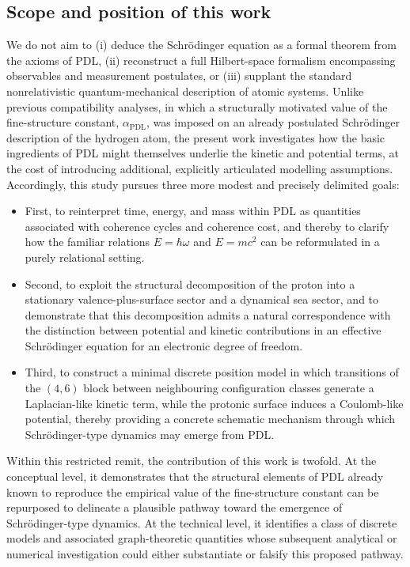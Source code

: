 \documentclass[11pt,a4paper]{article}
\begin{document}
\subsection{Scope and position of this work}

We do not aim to (i) deduce the Schr\"odinger equation as a formal theorem from the axioms of PDL, (ii) reconstruct a full Hilbert-space formalism encompassing observables and measurement postulates, or (iii) supplant the standard nonrelativistic quantum-mechanical description of atomic systems. Unlike previous compatibility analyses, in which a structurally motivated value of the fine-structure constant, $\alpha_{\mathrm{PDL}}$, was imposed on an already postulated Schr\"odinger description of the hydrogen atom, the present work investigates how the basic ingredients of PDL might themselves underlie the kinetic and potential terms, at the cost of introducing additional, explicitly articulated modelling assumptions. Accordingly, this study pursues three more modest and precisely delimited goals:
\begin{itemize}
\item First, to reinterpret time, energy, and mass within PDL as quantities associated with coherence cycles and coherence cost, and thereby to clarify how the familiar relations $E = \hbar \omega$ and $E = mc^{2}$ can be reformulated in a purely relational setting.
\item Second, to exploit the structural decomposition of the proton into a stationary valence-plus-surface sector and a dynamical sea sector, and to demonstrate that this decomposition admits a natural correspondence with the distinction between potential and kinetic contributions in an effective Schr\"odinger equation for an electronic degree of freedom.
\item Third, to construct a minimal discrete position model in which transitions of the $(4,6)$ block between neighbouring configuration classes generate a Laplacian-like kinetic term, while the protonic surface induces a Coulomb-like potential, thereby providing a concrete schematic mechanism through which Schr\"odinger-type dynamics may emerge from PDL.
\end{itemize}
Within this restricted remit, the contribution of this work is twofold. At the conceptual level, it demonstrates that the structural elements of PDL already known to reproduce the empirical value of the fine-structure constant can be repurposed to delineate a plausible pathway toward the emergence of Schr\"odinger-type dynamics. At the technical level, it identifies a class of discrete models and associated graph-theoretic quantities whose subsequent analytical or numerical investigation could either substantiate or falsify this proposed pathway.
\end{document}
